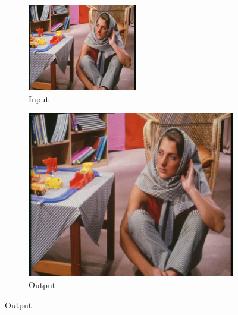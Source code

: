 \documentclass[12pt,a4paper]{article}
\begin{document}
        \begin{figure}[H]
            \centering
            \begin{subfigure}{0.2\textwidth}
                \includegraphics[width=\textwidth]{images/samples/img-2-input.png}
                \caption*{Input}
            \end{subfigure}
            \enspace
            \begin{subfigure}{0.2\textwidth}
                \includegraphics[width=\textwidth]{images/samples/img-2-orig.png}
                \caption*{Output}
            \end{subfigure}

\end{figure}
\end{document}
